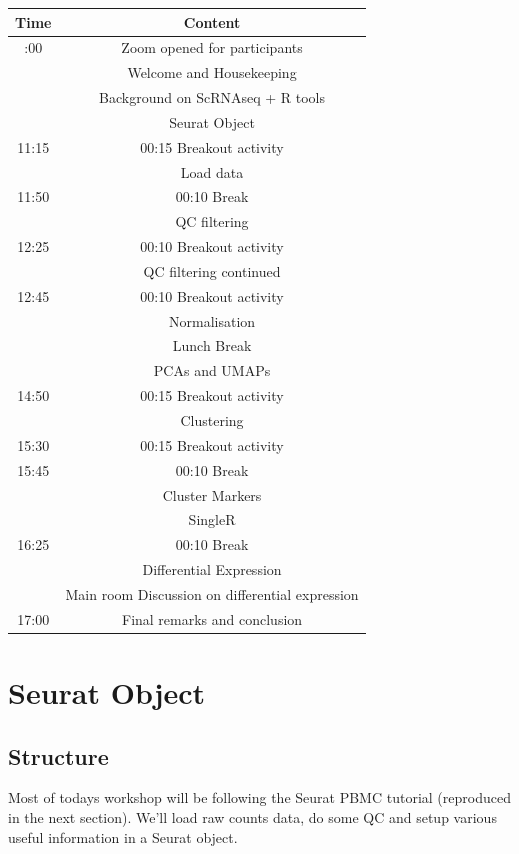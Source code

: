 \documentclass[
]{book}
\begin{document}
\begin{longtable}[]{@{}cc@{}}
\toprule\noalign{}
Time & Content \\
\midrule\noalign{}
\endhead
\bottomrule\noalign{}
\endlastfoot
10:00 & Zoom opened for participants \\
& Welcome and Housekeeping \\
& Background on ScRNAseq + R tools \\
& Seurat Object \\
11:15 & 00:15 Breakout activity \\
& Load data \\
11:50 & 00:10 Break \\
& QC filtering \\
12:25 & 00:10 Breakout activity \\
& QC filtering continued \\
12:45 & 00:10 Breakout activity \\
& Normalisation \\
& Lunch Break \\
& PCAs and UMAPs \\
14:50 & 00:15 Breakout activity \\
& Clustering \\
15:30 & 00:15 Breakout activity \\
15:45 & 00:10 Break \\
& Cluster Markers \\
& SingleR \\
16:25 & 00:10 Break \\
& Differential Expression \\
& Main room Discussion on differential expression \\
17:00 & Final remarks and conclusion \\
\end{longtable}

\hypertarget{part-seurat-object}{%
\part{Seurat Object}\label{part-seurat-object}}

\hypertarget{structure}{%
\chapter{Structure}\label{structure}}

Most of todays workshop will be following the Seurat PBMC tutorial (reproduced in the next section).
We'll load raw counts data, do some QC and setup various useful information in a Seurat object.
\end{document}

